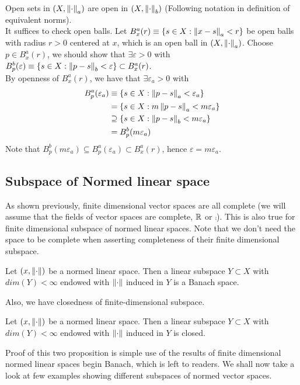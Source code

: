 \begin{proposition}\rm\nextline
	Open sets in $(X,\left\|{\cdot}\right\|_a)$ are open in $(X,\left\|{\cdot}\right\|_b)$ (Following notation in definition of equivalent norms).\\
	\pf
	It suffices to check open balls. Let $B^a_x(r)\equiv\{s\in X:\left\|{x-s}\right\|_a<r\}$ be open balls with radius $r>0$ centered at $x$, which is an open ball in $(X,\left\|{\cdot}\right\|_a)$. Choose $p\in B^a_x(r)$, we should show that $\exists \varepsilon>0$ with $B^b_p(\varepsilon)\equiv\{s\in X:\left\|{p-s}\right\|_b<\varepsilon\}\subset B^a_x(r)$.\\
	By openness of $B^a_x(r)$, we have that $\exists \varepsilon_a>0$ with
	\begin{equation}
		\begin{split}\nonumber
			B^a_p(\varepsilon_a)&\equiv\{s\in X:\left\|{p-s}\right\|_a<\varepsilon_a\}\\
			&=\{s\in X:m\left\|{p-s}\right\|_a<m\varepsilon_a\}\\
			&\supseteq \{s\in X:\left\|{p-s}\right\|_b<m\varepsilon_a\}\\
			&=B^b_p(m\varepsilon_a)
		\end{split}
	\end{equation}
	Note that $B^b_p(m\varepsilon_a)\subseteq B^a_p(\varepsilon_a)\subset B^a_x(r)$, hence $\varepsilon=m\varepsilon_a$.
\end{proposition}


\subsection{Subspace of Normed linear space}
As shown previously, finite dimensional vector spaces are all complete (we will assume that the fields of vector spaces are complete, $\mathbb{R}$ or $\comp$). This is also true for finite dimensional subspace of normed linear spaces. Note that we don't need the space to be complete when asserting completeness of their finite dimensional subspace.
\begin{proposition}
	\rm\nextline
	Let $(x,\left\|{\cdot}\right\|)$ be a normed linear space. Then a linear subspace $Y\subset X$ with $dim(Y)<\infty$ endowed with $\left\|{\cdot}\right\|$ induced in $Y$ is a Banach space.
\end{proposition}
Also, we have closedness of finite-dimensional subspace.
\begin{proposition}
	\rm\nextline
	Let $(x,\left\|{\cdot}\right\|)$ be a normed linear space. Then a linear subspace $Y\subset X$ with $dim(Y)<\infty$ endowed with $\left\|{\cdot}\right\|$ induced in $Y$ is closed.
\end{proposition}
Proof of this two proposition is simple use of the results of finite dimensional normed linear spaces begin Banach, which is left to readers. We shall now take a look at few examples showing different subspaces of normed vector spaces.

